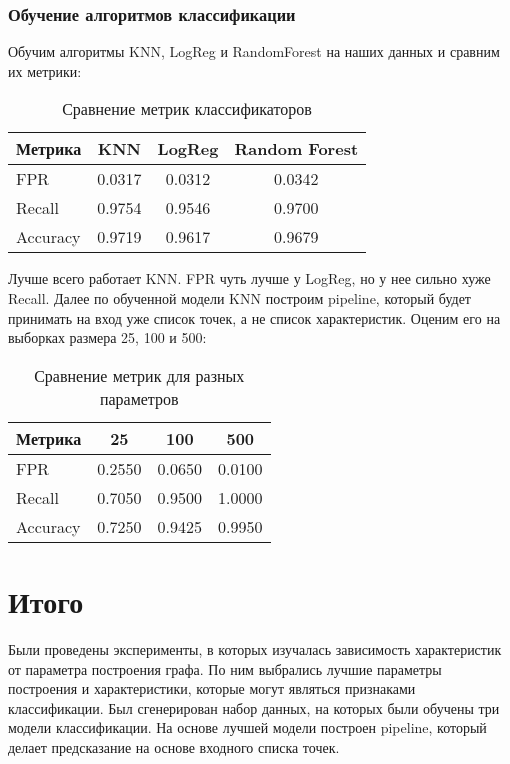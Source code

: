 \documentclass[a4paper,12pt]{article}
\begin{document}
\subsubsection{Обучение алгоритмов классификации}
Обучим алгоритмы KNN, LogReg и RandomForest на наших данных и сравним их метрики:
\begin{table}[h]
\centering
\caption{Сравнение метрик классификаторов}
\begin{tabular}{lccc}
\toprule
\textbf{Метрика} & \textbf{KNN} & \textbf{LogReg} & \textbf{Random Forest} \\
\midrule
FPR      & 0.0317 & 0.0312 & 0.0342 \\
Recall   & 0.9754 & 0.9546 & 0.9700 \\
Accuracy & 0.9719 & 0.9617 & 0.9679 \\
\bottomrule
\end{tabular}
\end{table}

Лучше всего работает KNN. FPR чуть лучше у LogReg, но у нее сильно хуже Recall.
Далее по обученной модели KNN построим pipeline, который будет принимать на вход уже список точек, а не список характеристик. Оценим его на выборках размера 25, 100 и 500:

\begin{table}[h]
\centering
\caption{Сравнение метрик для разных параметров}
\begin{tabular}{lccc}
\toprule
\textbf{Метрика} & \textbf{25} & \textbf{100} & \textbf{500} \\
\midrule
FPR      & 0.2550 & 0.0650 & 0.0100 \\
Recall   & 0.7050 & 0.9500 & 1.0000 \\
Accuracy & 0.7250 & 0.9425 & 0.9950 \\
\bottomrule
\end{tabular}
\section{Итого}
Были проведены эксперименты, в которых изучалась зависимость характеристик от параметра построения графа. По ним выбрались лучшие параметры построения и характеристики, которые могут являться признаками классификации. Был сгенерирован набор данных, на которых были обучены три модели классификации. На основе лучшей модели построен pipeline, который делает предсказание на основе входного списка точек.
\end{table}
\end{document}
